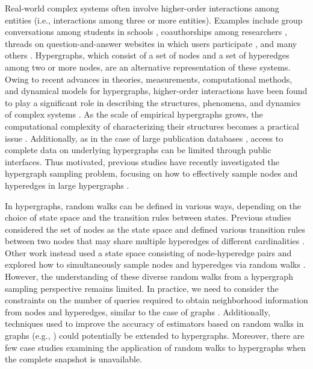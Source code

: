 Real-world complex systems often involve higher-order interactions among entities (i.e., interactions among three or more entities).
Examples include group conversations among students in schools \cite{stehl2011, mastrandrea2015}, coauthorships among researchers \cite{patania2017}, threads on question-and-answer websites in which users participate \cite{benson2018}, and many others \cite{battiston2020}.
Hypergraphs, which consist of a set of nodes and a set of hyperedges among two or more nodes, are an alternative representation of these systems.
Owing to recent advances in theories, measurements, computational methods, and dynamical models for hypergraphs, higher-order interactions have been found to play a significant role in describing the structures, phenomena, and dynamics of complex systems \cite{battiston2020, battiston2021, majhi2022, boccaletti2023}.
As the scale of empirical hypergraphs grows, the computational complexity of characterizing their structures becomes a practical issue \cite{ruggeri2023, lotito2024}.
Additionally, as in the case of large publication databases \cite{sinha2015, priem2022}, access to complete data on underlying hypergraphs can be limited through public interfaces.
Thus motivated, previous studies have recently investigated the hypergraph sampling problem, focusing on how to effectively sample nodes and hyperedges in large hypergraphs \cite{choe2022, choe2024, lee2025}.

In hypergraphs, random walks can be defined in various ways, depending on the choice of state space and the transition rules between states. 
Previous studies considered the set of nodes as the state space and defined various transition rules between two nodes that may share multiple hyperedges of different cardinalities \cite{zhou2006, chaudhuri2019, hayashi2020, aksoy2020, battiston2020, carletti2020, eriksson2021, carletti2021, banerjee2021, nagasato2023, traversa2024}. 
Other work instead used a state space consisting of node-hyperedge pairs and explored how to simultaneously sample nodes and hyperedges via random walks \cite{zhang2023, luo2024}. 
However, the understanding of these diverse random walks from a hypergraph sampling perspective remains limited. 
In practice, we need to consider the constraints on the number of queries required to obtain neighborhood information from nodes and hyperedges, similar to the case of graphs \cite{gjoka2011, hardiman2013}. 
Additionally, techniques used to improve the accuracy of estimators based on random walks in graphs (e.g., \cite{lee2012, li2015}) could potentially be extended to hypergraphs. 
Moreover, there are few case studies examining the application of random walks to hypergraphs when the complete snapshot is unavailable.

